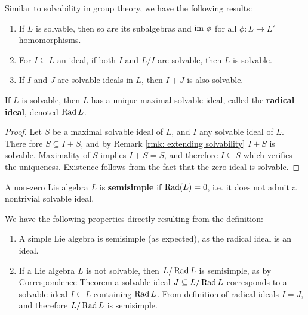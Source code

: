 \documentclass{article}
\begin{document}
\begin{remark}\label{rmk: extending solvability}
    Similar to solvability in group theory, we have the following results:
    \begin{enumerate}
        \item If $L$ is solvable, then so are its subalgebras and $\mathrm{im}\  \phi$ for all $\phi: L \to L'$ homomorphisms.
        \item For $I \subseteq L$ an ideal, if both $I$ and $L/I$ are solvable, then $L$ is solvable.
        \item If $I$ and $J$ are solvable ideals in $L$, then $I + J$ is also solvable.   
    \end{enumerate}
\end{remark}

\begin{corollary}
    If $L$ is solvable, then $L$ has a unique maximal solvable ideal, called the \textbf{radical ideal}, denoted $\operatorname{Rad} L$.
\end{corollary}

\begin{proof}
    Let $S$ be a maximal solvable ideal of $L$, and $I$ any solvable ideal of $L$. There fore $S \subseteq I + S$, and by Remark \ref{rmk: extending solvability} $I + S$ is solvable. Maximality of $S$ implies $I + S = S$, and therefore $I \subseteq S$ which verifies the uniqueness. Existence follows from the fact that the zero ideal is solvable.
\end{proof}

\begin{definition}
    A non-zero Lie algebra $L$ is \textbf{semisimple} if $\operatorname{Rad}(L) = 0$, i.e. it does not admit a nontrivial solvable ideal.
\end{definition}

\begin{remark}
    We have the following properties directly resulting from the definition:
    \begin{enumerate}
        \item A simple Lie algebra is semisimple (as expected), as the radical ideal is an ideal.
        \item If a Lie algebra $L$ is not solvable, then $L/\operatorname{Rad} L$ is semisimple, as by Correspondence Theorem a solvable ideal $J \subseteq L/\operatorname{Rad} L$ corresponds to a solvable ideal $I \subseteq L$ containing $\operatorname{Rad} L$. From definition of radical ideals $I = J$, and therefore $L/\operatorname{Rad} L$ is semisimple.
    \end{enumerate}
\end{remark}
\end{document}

